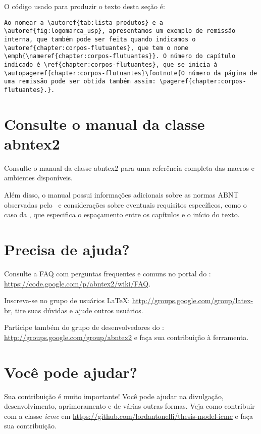 O código usado para produzir o texto desta seção é:

\begin{verbatim}
Ao nomear a \autoref{tab:lista_produtos} e a \autoref{fig:logomarca_usp}, apresentamos um exemplo de remissão interna, que também pode ser feita quando indicamos o \autoref{chapter:corpos-flutuantes}, que tem o nome \emph{\nameref{chapter:corpos-flutuantes}}. O número do capítulo indicado é \ref{chapter:corpos-flutuantes}, que se inicia à \autopageref{chapter:corpos-flutuantes}\footnote{O número da página de uma remissão pode ser obtida também assim: \pageref{chapter:corpos-flutuantes}.}.
\end{verbatim}



\section{Consulte o manual da classe \textsf{abntex2}}

Consulte o manual da classe \textsf{abntex2} \cite{abntex2classe} para uma
referência completa das macros e ambientes disponíveis. 

Além disso, o manual possui informações adicionais sobre as normas ABNT
observadas pelo \abnTeX\ e considerações sobre eventuais requisitos específicos, como o caso da , que
especifica o espaçamento entre os capítulos e o início do texto.



\section{Precisa de ajuda?}

Consulte a FAQ com perguntas frequentes e comuns no portal do \abnTeX:
\url{https://code.google.com/p/abntex2/wiki/FAQ}.

Inscreva-se no grupo de usuários \LaTeX:
\url{http://groups.google.com/group/latex-br}, tire suas dúvidas e ajude
outros usuários.

Participe também do grupo de desenvolvedores do \abnTeX:
\url{http://groups.google.com/group/abntex2} e faça sua contribuição à
ferramenta.


\section{Você pode ajudar?}

Sua contribuição é muito importante! Você pode ajudar na divulgação,
desenvolvimento, aprimoramento e de várias outras formas. Veja como contribuir com a classe \textit{icmc} em
\url{https://github.com/lordantonelli/thesis-model-icmc} e faça sua contribuição.
